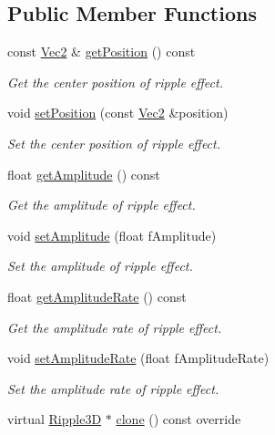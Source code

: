 \subsection*{Public Member Functions}
\begin{DoxyCompactItemize}
\item 
const \hyperlink{classVec2}{Vec2} \& \hyperlink{classRipple3D_aea226ed8d1d72fa88cd5643a75c5e404}{get\+Position} () const
\begin{DoxyCompactList}\small\item\em Get the center position of ripple effect. \end{DoxyCompactList}\item 
void \hyperlink{classRipple3D_af80c68000b6bb6f2e1d8f78cd8712ef7}{set\+Position} (const \hyperlink{classVec2}{Vec2} \&position)
\begin{DoxyCompactList}\small\item\em Set the center position of ripple effect. \end{DoxyCompactList}\item 
float \hyperlink{classRipple3D_ac9565db28bedd7b2f71a2fb7ac49e04f}{get\+Amplitude} () const
\begin{DoxyCompactList}\small\item\em Get the amplitude of ripple effect. \end{DoxyCompactList}\item 
void \hyperlink{classRipple3D_ad31bc9587e1562638c3ce843376fb68b}{set\+Amplitude} (float f\+Amplitude)
\begin{DoxyCompactList}\small\item\em Set the amplitude of ripple effect. \end{DoxyCompactList}\item 
float \hyperlink{classRipple3D_a721189b2c0cca07f653f4a625ef8a2c1}{get\+Amplitude\+Rate} () const
\begin{DoxyCompactList}\small\item\em Get the amplitude rate of ripple effect. \end{DoxyCompactList}\item 
void \hyperlink{classRipple3D_a328b21e3d9d03027cd9bcb7873b77b2d}{set\+Amplitude\+Rate} (float f\+Amplitude\+Rate)
\begin{DoxyCompactList}\small\item\em Set the amplitude rate of ripple effect. \end{DoxyCompactList}\item 
virtual \hyperlink{classRipple3D}{Ripple3D} $\ast$ \hyperlink{classRipple3D_a704ef078cca9cde6c85acbcd8e11cc4e}{clone} () const override

\end{DoxyCompactItemize}
